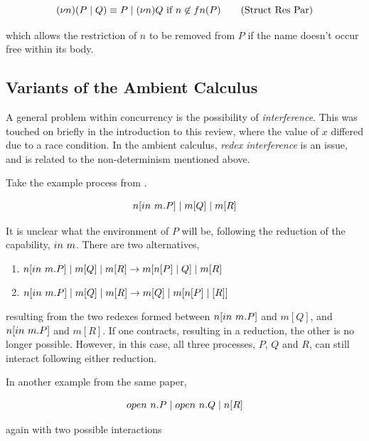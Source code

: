 \begin{equation}
(\nu n)(P \pc Q) \equiv P \pc (\nu n) Q\ \text{if}\ n \not \in fn(P) \tag{Struct Res Par}
\end{equation}

\noindent which allows the restriction of $n$ to be removed from $P$
if the name doesn't occur free within its body.

\subsection{Variants of the Ambient Calculus}
\label{ambvariants}

A general problem within concurrency is the possibility of
\emph{interference}.  This was touched on briefly in the introduction
to this review, where the value of $x$ differed due to a race
condition.  In the ambient calculus, \emph{redex interference}
\cite{sangiorgi:mobsafeambients} is an issue, and is related to the
non-determinism mentioned above.

Take the example process from \cite{sangiorgi:mobsafeambients}.

\begin{equation}
n[in\ m.P] \;|\; m[Q] \;|\; m[R]
\end{equation}

\noindent It is unclear what the environment of $P$ will be, following
the reduction of the capability, $in\ m$.  There are two
alternatives,

\begin{enumerate}
\item $n[in\ m.P] \;|\; m[Q] \;|\; m[R] \rightarrow m[n[P] \;|\; Q] \;|\; m[R]$
\item $n[in\ m.P] \;|\; m[Q] \;|\; m[R] \rightarrow m[Q] \;|\; m[n[P] \;|\; [R]]$
\end{enumerate}

\noindent resulting from the two redexes formed between
$n[in\ m.P]$ and $m[Q]$, and $n[in\ m.P]$ and $m[R]$.  If one
contracts, resulting in a reduction, the other is no longer possible.
However, in this case, all three processes, $P$, $Q$ and $R$, can
still interact following either reduction.

In another example from the same paper,

\begin{equation}
open\ n.P \;|\; open\ n.Q \;|\; n[R]
\end{equation}

\noindent again with two possible interactions

